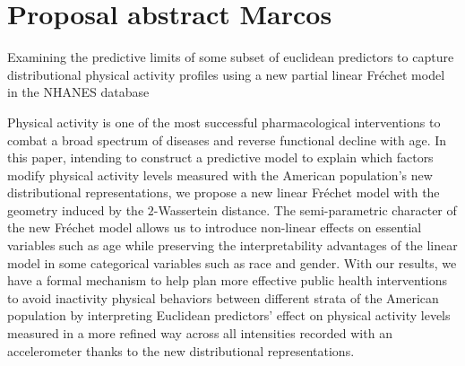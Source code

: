 \documentclass{article}
\begin{document}
\begin{algorithm}
\end{algorithm}



%
%



\cite{ghosal2021fr}



\section{Proposal abstract Marcos}


Examining the predictive limits of some subset of euclidean predictors to capture  distributional physical activity profiles using a new partial linear Fréchet model in the NHANES database


Physical activity is one of the most successful pharmacological interventions to combat a broad spectrum of diseases and reverse functional decline with age. In this paper, intending to construct a predictive model to explain which factors modify physical activity levels measured with the American population's new distributional representations, we propose a new linear Fréchet model with the geometry induced by the $2$-Wassertein distance. The semi-parametric character of the new Fréchet model allows us to introduce non-linear effects on essential variables such as age while preserving the interpretability advantages of the linear model in some categorical variables such as race and gender. With our results, we have a formal mechanism to help plan more effective public health interventions to avoid inactivity physical behaviors between different strata of the American population by interpreting Euclidean predictors' effect on physical activity levels measured in a more refined way across all intensities recorded with an accelerometer thanks to the new distributional representations. 
\end{document}
